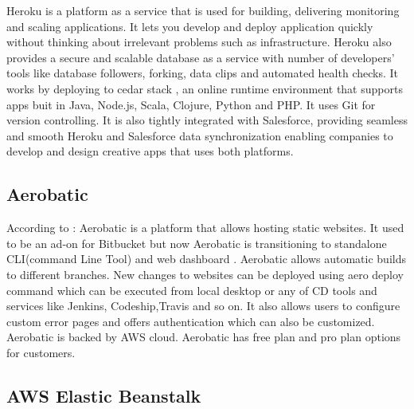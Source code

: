     Heroku \cite{www-Heroku} is a platform as a service that is used
    for building, delivering monitoring and scaling applications. It
    lets you develop and deploy application quickly without thinking
    about irrelevant problems such as infrastructure. Heroku also
    provides a secure and scalable database as a service with number
    of developers’ tools like database followers, forking, data clips
    and automated health checks. It works by deploying to cedar stack
    \cite{www-cedar}, an online runtime environment that supports
    apps buit in Java, Node.js, Scala, Clojure, Python and PHP. It
    uses Git for version controlling. It is also tightly integrated
    with Salesforce, providing seamless and smooth Heroku and
    Salesforce data synchronization enabling companies to develop and
    design creative apps that uses both platforms.

\subsection{Aerobatic}

    According to \cite{www-aero}: Aerobatic is a platform that allows
    hosting static websites. It used to be an ad-on for Bitbucket but
    now Aerobatic is transitioning to standalone CLI(command Line
    Tool) and web dashboard . Aerobatic allows automatic builds to
    different branches. New changes to websites can be deployed using
    aero deploy command which can be executed from local desktop or
    any of CD tools and services like Jenkins, Codeship,Travis and so
    on.  It also allows users to configure custom error pages and
    offers authentication which can also be customized. Aerobatic is
    backed by AWS cloud. Aerobatic has free plan and pro plan options
    for customers.
    

\subsection{AWS Elastic Beanstalk}

